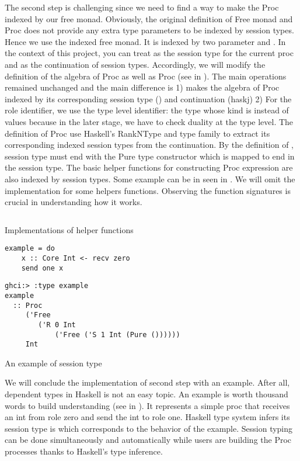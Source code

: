 The second step is challenging since we need to find a way to make the Proc indexed by our free monad. Obviously, the original definition of Free monad and Proc does not provide any extra type parameters to be indexed by session types. Hence we use the indexed free monad. It is indexed by two parameter  and . In the context of this project, you can treat  as the session type for the current proc  and  as the continuation of session types. Accordingly, we will modify the definition of the algebra of Proc as well as Proc (see in ). The main operations remained unchanged and the main difference is 1) makes the algebra of Proc indexed by its corresponding session type () and continuation (hask{j}) 2) For the role identifier, we use the type level identifier: the type whose kind is  instead of values because in the later stage, we have to check duality at the type level. The definition of Proc use Haskell's RankNType and type family \hask{>*>} to extract its corresponding indexed session types  from the continuation. By the definition of \hask{>*>}, session type  must end with the Pure type constructor which is mapped to end in the session type. The basic helper functions for constructing Proc expression are also indexed by session types. Some example can be in seen in . We will omit the implementation for some helpers functions. Observing the function signatures is crucial in understanding how it works.
\begin{listing}[ht]
    \inputminted{Haskell}{impl/typehelper.hs}
    \caption{Implementations of helper functions}
    \label{impl:code:typehelper}
\end{listing}

\begin{listing}[ht]
\begin{verbatim}
example = do
    x :: Core Int <- recv zero 
    send one x
\end{verbatim}
\begin{verbatim}
ghci:> :type example
example
  :: Proc
     ('Free
        ('R 0 Int
            ('Free ('S 1 Int (Pure ())))))
     Int
\end{verbatim}
    \caption{An example of session type}
    \label{impl:code:typeexample}
\end{listing}

We will conclude the implementation of second step with an example. After all, dependent types in Haskell is not an easy topic. An example is worth thousand words to build understanding (see in ). It represents a simple proc that receives an int from role zero and send the int to role one. Haskell type system infers its session type is  which corresponds to the behavior of the example. Session typing can be done simultaneously and automatically while users are building the Proc processes thanks to Haskell's type inference.

